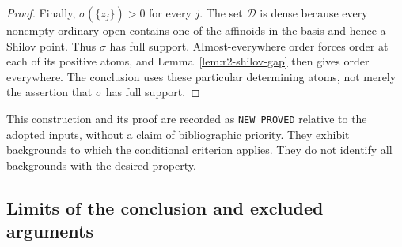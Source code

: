 \documentclass[11pt,a4paper]{article}
\numberwithin{equation}{section}
\theoremstyle{definition}
\theoremstyle{remark}
\begin{document}
\begin{proof}
Finally, $\sigma(\{z_j\})>0$ for every $j$. The set $\mathscr D$ is
dense because every nonempty ordinary open contains one of the
affinoids in the basis and hence a Shilov point. Thus $\sigma$ has
full support. Almost-everywhere order forces order at each of its
positive atoms, and Lemma~\ref{lem:r2-shilov-gap} then gives order
everywhere. The conclusion uses these particular determining atoms,
not merely the assertion that $\sigma$ has full support.
\end{proof}

This construction and its proof are recorded as
\texttt{NEW\_PROVED} relative to the adopted inputs, without a claim
of bibliographic priority. They exhibit backgrounds to which the
conditional criterion applies. They do not identify all backgrounds
with the desired property.

\subsection{Limits of the conclusion and excluded arguments}
\end{document}
